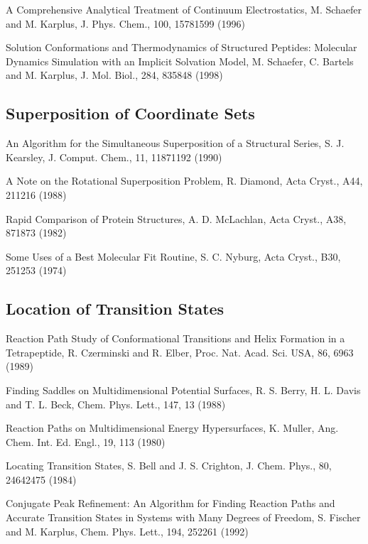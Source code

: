\documentclass[letterpaper,11pt,english]{sphinxmanual}
\begin{document}
\sphinxAtStartPar
A Comprehensive Analytical Treatment of Continuum Electrostatics, M. Schaefer and M. Karplus, J. Phys. Chem., 100, 1578\sphinxhyphen{}1599 (1996)

\sphinxAtStartPar
Solution Conformations and Thermodynamics of Structured Peptides: Molecular Dynamics Simulation with an Implicit Solvation Model, M. Schaefer, C. Bartels and M. Karplus, J. Mol. Biol., 284, 835\sphinxhyphen{}848 (1998)


\subsection{Superposition of Coordinate Sets}
\label{\detokenize{text/references:superposition-of-coordinate-sets}}
\sphinxAtStartPar
An Algorithm for the Simultaneous Superposition of a Structural Series, S. J. Kearsley, J. Comput. Chem., 11, 1187\sphinxhyphen{}1192 (1990)

\sphinxAtStartPar
A Note on the Rotational Superposition Problem, R. Diamond, Acta Cryst., A44, 211\sphinxhyphen{}216 (1988)

\sphinxAtStartPar
Rapid Comparison of Protein Structures, A. D. McLachlan, Acta Cryst., A38, 871\sphinxhyphen{}873 (1982)

\sphinxAtStartPar
Some Uses of a Best Molecular Fit Routine, S. C. Nyburg, Acta Cryst., B30, 251\sphinxhyphen{}253 (1974)


\subsection{Location of Transition States}
\label{\detokenize{text/references:location-of-transition-states}}
\sphinxAtStartPar
Reaction Path Study of Conformational Transitions and Helix Formation in a Tetrapeptide, R. Czerminski and R. Elber, Proc. Nat. Acad. Sci. USA, 86, 6963 (1989)

\sphinxAtStartPar
Finding Saddles on Multidimensional Potential Surfaces, R. S. Berry, H. L. Davis and T. L. Beck, Chem. Phys. Lett., 147, 13 (1988)

\sphinxAtStartPar
Reaction Paths on Multidimensional Energy Hypersurfaces, K. Muller, Ang. Chem. Int. Ed. Engl., 19, 1\sphinxhyphen{}13 (1980)

\sphinxAtStartPar
Locating Transition States, S. Bell and J. S. Crighton, J. Chem. Phys., 80, 2464\sphinxhyphen{}2475 (1984)

\sphinxAtStartPar
Conjugate Peak Refinement: An Algorithm for Finding Reaction Paths and Accurate Transition States in Systems with Many Degrees of Freedom, S. Fischer and M. Karplus, Chem. Phys. Lett., 194, 252\sphinxhyphen{}261 (1992)
\end{document}
